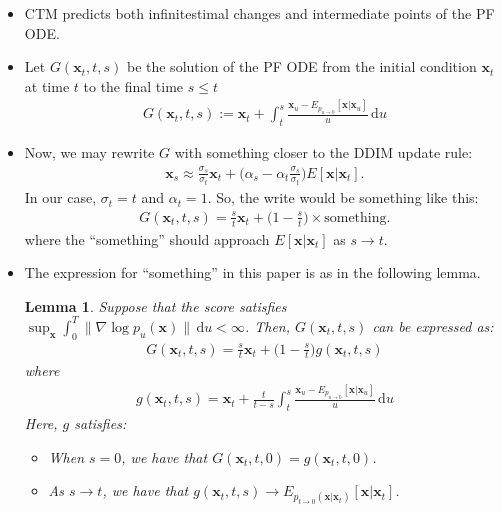 \documentclass[10pt]{article}
\newtheorem{lemma}{Lemma}
\newcommand{\dee}{\mathrm{d}}
\newcommand{\ve}[1]{\mathbf{#1}}
\begin{document}
\begin{itemize}
  \item CTM predicts both infinitestimal changes and intermediate points of the PF ODE.
  
  \item Let $G(\ve{x}_t, t, s)$ be the solution of the PF ODE from the initial condition $\ve{x}_t$ at time $t$ to the final time $s \leq t$
  \begin{align*}
    G(\ve{x}_t, t, s) := \ve{x}_t + \int_t^s \frac{\ve{x}_u - E_{p_{u \rightarrow 0}}[\ve{x}|\ve{x}_u]}{u}\, \dee u
  \end{align*}

  \item Now, we may rewrite $G$ with something closer to the DDIM update rule:
  \begin{align*}
    \ve{x}_s \approx \frac{\sigma_s}{\sigma_t} \ve{x}_t + \bigg(\alpha_s - \alpha_t \frac{\sigma_s}{\sigma_t} \bigg) E[\ve{x}|\ve{x}_t].
  \end{align*}
  In our case, $\sigma_t = t$ and $\alpha_t = 1$. So, the write would be something like this:
  \begin{align*}
    G(\ve{x}_t, t, s) =  \frac{s}{t}\ve{x}_t + \bigg(1 - \frac{s}{t} \bigg) \times \mathrm{something}.
  \end{align*}
  where the ``something'' should approach $E[\ve{x}|\ve{x}_t]$ as $s \rightarrow t$.
  
  \item The expression for ``something'' in this paper is as in the following lemma.
  \begin{lemma}
    Suppose that the score satisfies $\sup_{\ve{x}} \int_0^T \| \nabla \log p_u(\ve{x}) \|\, \dee u < \infty$. Then, $G(\ve{x}_t, t, s)$ can be expressed as:
    \begin{align*}
      G(\ve{x}_t, t, s) = \frac{s}{t}\ve{x}_t + \bigg( 1 - \frac{s}{t} \bigg) g(\ve{x}_t, t, s)
    \end{align*}
    where
    \begin{align*}
      g(\ve{x}_t, t, s) = \ve{x}_t + \frac{t}{t-s} \int_t^s \frac{\ve{x}_u - E_{p_{u \rightarrow 0}}[\ve{x}|\ve{x}_u]}{u}\, \dee u
    \end{align*}
    Here, $g$ satisfies:
    \begin{itemize}
      \item When $s = 0$, we have that $G(\ve{x}_t, t, 0) = g(\ve{x}_t, t, 0)$.
      \item As $s \rightarrow t$, we have that $g(\ve{x}_t, t, s) \rightarrow E_{p_{t \rightarrow 0}(\ve{x}|\ve{x}_t)}[\ve{x}| \ve{x}_t]$.
    \end{itemize}
  \end{lemma}


\end{itemize}
\end{document}
